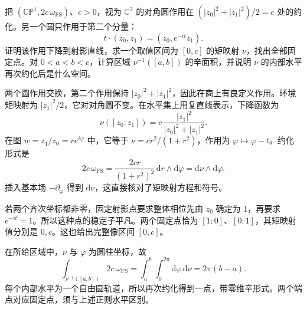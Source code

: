 \begin{exercise}\label{g4:ex:1003:projective-residual-circle}
	把 \((\mathbb{CP}^1,2c\,\omega_{\mathrm{FS}})\)、\(c>0\)，视为 \(\mathbb C^2\) 的对角圆作用在 \((|z_0|^2+|z_1|^2)/2=c\) 处的约化。另一个圆只作用于第二个分量：
	\[
		t\cdot(z_0,z_1)=(z_0,e^{-it}z_1).
	\]
	证明该作用下降到射影直线，求一个取值区间为 \([0,c]\) 的矩映射 \(\nu\)，找出全部固定点。对 \(0<a<b<c\)，计算区域 \(\nu^{-1}([a,b])\) 的辛面积，并说明 \(\nu\) 的内部水平再次约化后是什么空间。
\end{exercise}
\begin{solution}
	两个圆作用交换，第二个作用保持 \(|z_0|^2+|z_1|^2\)，因此在商上有良定义作用。环境矩映射为 \(|z_1|^2/2\)，它对对角圆不变。在水平集上用复直线表示，下降函数为
	\[
		\nu([z_0:z_1])
		=c\,\frac{|z_1|^2}{|z_0|^2+|z_1|^2}.
	\]
	在图 \(w=z_1/z_0=re^{i\varphi}\) 中，它等于
	\(\nu=cr^2/(1+r^2)\)，作用为 \(\varphi\mapsto\varphi-t\)。约化形式是
	\[
		2c\,\omega_{\mathrm{FS}}
		=\frac{2cr}{(1+r^2)^2}\,\mathrm{d}r\wedge\mathrm{d}\varphi
		=\mathrm{d}\nu\wedge\mathrm{d}\varphi.
	\]
	插入基本场 \(-\partial_\varphi\) 得到 \(\mathrm{d}\nu\)，这直接核对了矩映射方程和符号。

	若两个齐次坐标都非零，固定射影点要求整体相位先由 \(z_0\) 确定为 \(1\)，再要求 \(e^{-it}=1\)。所以这种点的稳定子平凡。两个固定点恰为 \([1:0]\)、\([0:1]\)，其矩映射值分别是 \(0,c\)。这也给出完整像区间 \([0,c]\)。

	在所给区域中，\(\nu\) 与 \(\varphi\) 为圆柱坐标，故
	\[
		\int_{\nu^{-1}([a,b])}2c\,\omega_{\mathrm{FS}}
		=\int_a^b\int_0^{2\pi}\mathrm{d}\varphi\,\mathrm{d}\nu
		=2\pi(b-a).
	\]
	每个内部水平为一个自由圆轨道，所以再次约化得到一点，带零维辛形式。两个端点对应固定点，须与上述正则水平区别。
\end{solution}


